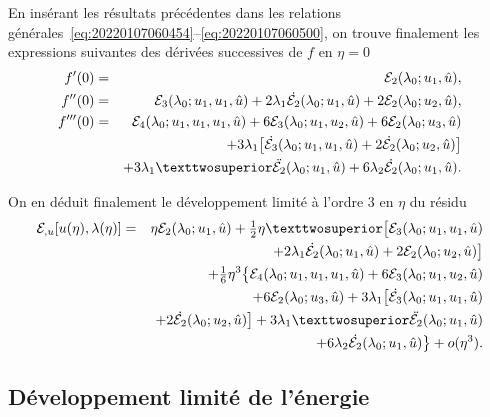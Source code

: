 \documentclass[12pt, final]{amsart}
\begin{document}
En insérant les résultats précédentes dans les relations
générales~\eqref{eq:20220107060454}--\eqref{eq:20220107060500}, on trouve
finalement les expressions suivantes des dérivées successives de \(f\) en
\(\eta =0\)
\begin{eqnarray}
  f'(0)
  &=&\mathcal E_2(\lambda _0; u_1, \hat{u}),\\
  f''(0)
  &=&\mathcal E_3(\lambda _0; u_1, u_1, \hat{u})
    +2\lambda _1\dot{\mathcal E_2}(\lambda _0; u_1, \hat{u})
    +2\mathcal E_2(\lambda _0; u_2, \hat{u}),\\
  \notag
  f'''(0)
  &=&\mathcal E_4(\lambda _0; u_1, u_1, u_1, \hat{u})
      +6\mathcal E_3(\lambda _0; u_1, u_2, \hat{u})
    +6\mathcal E_2(\lambda _0; u_3, \hat{u})\\
  \notag
  &&+3\lambda _1\bigl[\dot{\mathcal E_3}(\lambda _0; u_1, u_1, \hat{u})
     +2\dot{\mathcal E_2}(\lambda _0; u_2, \hat{u})\bigr]\\
  &&+3\lambda _1²\ddot{\mathcal E_2}(\lambda _0; u_1, \hat{u})
     +6\lambda _2\dot{\mathcal E_2}(\lambda _0; u_1, \hat{u}).
\end{eqnarray}

On en déduit finalement le développement limité à l'ordre 3 en \(\eta \) du résidu
\begin{eqnarray}
    \mathcal E_{,u}[u(\eta ), \lambda (\eta )]
    &=&\eta \mathcal E_2(\lambda _0; u_1, \hat{u})
    +\tfrac12\eta ²\bigl[\mathcal E_3(\lambda _0; u_1, u_1, \hat{u})\\
    \notag
    &&+2\lambda _1\dot{\mathcal E_2}(\lambda _0; u_1, \hat{u})
    +2\mathcal E_2(\lambda _0; u_2, \hat{u})\bigr]\\
    \notag
    &&+\tfrac16\eta ^3\bigl\{
    \mathcal E_4(\lambda _0; u_1, u_1, u_1, \hat{u})
    +6\mathcal E_3(\lambda _0; u_1, u_2, \hat{u})\\
    \notag
    &&+6\mathcal E_2(\lambda _0; u_3, \hat{u})
    +3\lambda _1\bigl[\dot{\mathcal E_3}(\lambda _0; u_1, u_1, \hat{u})\\
    \notag
    &&+2\dot{\mathcal E_2}(\lambda _0; u_2, \hat{u})\bigr]
    +3\lambda _1²\ddot{\mathcal E_2}(\lambda _0; u_1, \hat{u})\\
    \label{eq:20220107080901}
    &&+6\lambda _2\dot{\mathcal E_2}(\lambda _0; u_1, \hat{u})\bigr\}
    +o(\eta ^3).
\end{eqnarray}

\subsection{Développement limité de l'énergie}
\label{sec:20220121172919}
\end{document}
